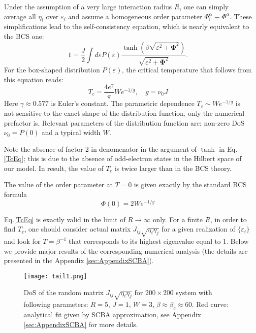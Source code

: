 \documentclass[twocolumn,english,prb]{revtex4-1}
\begin{document}
Under the assumption of a very large interaction radius $R$, one can simply average all $\eta_i$ over $\varepsilon_i$ and assume a homogeneous order parameter $\Phi_i^\alpha \equiv \Phi^\alpha$. These simplifications lead to the self-consistency equation, which is nearly equivalent to the BCS one:
\begin{equation}
1=\frac{J}{2}\int d\varepsilon P(\varepsilon)\frac{\tanh\left(\beta\sqrt{\varepsilon^{2}+\boldsymbol{\Phi}^{2}}\right)}{\sqrt{\varepsilon^{2}+\boldsymbol{\Phi}^{2}}}.
\label{TcEq}
\end{equation}
For the box-shaped distribution $P(\varepsilon)$, the critical temperature that follows from this equation reads:
\begin{equation}
\label{eq:TcMeanField}
T_c = \frac{4e^{\gamma}}{\pi}We^{-1/g},\quad g = \nu_0 J
\end{equation}
Here $\gamma \approx 0.577$ is Euler's constant. The parametric dependence $T_c \sim W e^{-1/g}$ is not sensitive to the exact shape of the distribution function, only the numerical prefactor is.  Relevant parameters of the distribution function  are:  non-zero DoS $\nu_0 = P(0)$ and a typical width $W$.

Note the absence of factor 2 in denomenator in the argument of
$\tanh $ in Eq.\eqref{TcEq}; this is due to
the absence of odd-electron states in the Hilbert space of our model.  In result, the value of $T_c$ is twice larger
than in the BCS theory.

The value of the order parameter at $T=0$ is given exactly by the standard
BCS formula
\begin{equation}
\label{eq:Delta}
\Phi(0) =  2We^{-1/g}
\end{equation}

Eq.\eqref{TcEq} is exactly valid in the limit of $R\to \infty$ only. For a finite $R$, in order to find $T_c$,
one should consider actual matrix
$J_{ij} \sqrt{\eta_i \eta_j}$ for a given realization of $\{\varepsilon_i\}$ and look for $T = \beta^{-1}$ that
 corresponds to its highest eigenvalue equal to 1.
Below we provide major results of the corresponding numerical analysis (the details are presented in the Appendix \ref{sec:AppendixSCBA}). 

\begin{figure}
	\texttt{[image: tail1.png]}
	\caption{DoS of the random matrix $J_{ij} \sqrt{\eta_i \eta_j}$ for $200 \times 200$ system with following parameters: $R = 5$, $J = 1$, $W = 3$, $\beta \approx \beta_c \approx 60$. Red curve: analytical fit given by SCBA approximation, see Appendix \ref{sec:AppendixSCBA} for more details.}
	\label{fig:tail1}
\end{figure}
\end{document}
